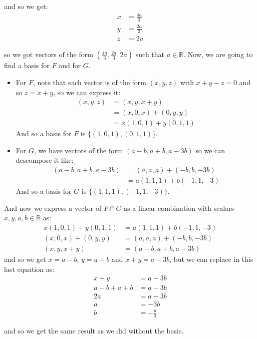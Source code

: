 \documentclass[final,expand]{problemset}
\begin{document}
{	and so we get:
	\begin{align*}
		x &= \frac{4a}{3}\\
		y &= \frac{2a}{3}\\
		z &= 2a
	\end{align*}

	so we got vectors of the form $\left(\frac{4a}{3}, \frac{2a}{3}, 2a\right)$ such that $a \in \mathbb{R}$. Now, we are going to find a basis for $F$ and for $G$.

	\begin{itemize}
		\item For $F$, note that each vector is of the form $(x, y, z)$ with $x + y - z = 0$ and so $z = x + y$, so we can express it:
		\begin{align*}
			(x, y, z) &= (x, y, x+y)\\
			&= (x, 0, x) + (0, y, y)\\
			&= x(1, 0, 1) + y(0, 1, 1)
		\end{align*}
		And so a basis for $F$ is $\{(1, 0, 1), (0, 1, 1)\}$.

		\item For $G$, we have vectors of the form $(a-b, a+b, a-3b)$ so we can descompose it like:
		\begin{align*}
			(a-b, a+b, a-3b) &= (a, a, a) + (-b, b, -3b)\\
			&= a(1, 1, 1) + b(-1, 1, -3)
		\end{align*}
		And so a basis for $G$ is $\{(1, 1, 1), (-1, 1, -3)\}$.
	\end{itemize}

	And now we express a vector of $F \cap G$ as a linear combination with scalars $x, y, a, b \in \mathbb{R}$ as:
	\begin{align*}
		x(1, 0, 1) + y(0, 1, 1) &= a(1, 1, 1) + b(-1, 1, -3)\\
		(x, 0, x) + (0, y, y) &= (a, a, a) + (-b, b, -3b)\\
		(x, y, x+y) &= (a-b, a+b, a-3b)
	\end{align*}
	and so we get $x = a - b$, $y = a + b$ and $x + y = a - 3b$, but we can replace in this last equation as:
	\begin{align*}
		x + y &= a - 3b\\
		a - b + a + b &= a - 3b\\
		2a &= a - 3b\\
		a &= -3b\\
		b &= -\frac{a}{3}
	\end{align*}

	and so we get the same result as we did without the basis.
}
\end{document}
